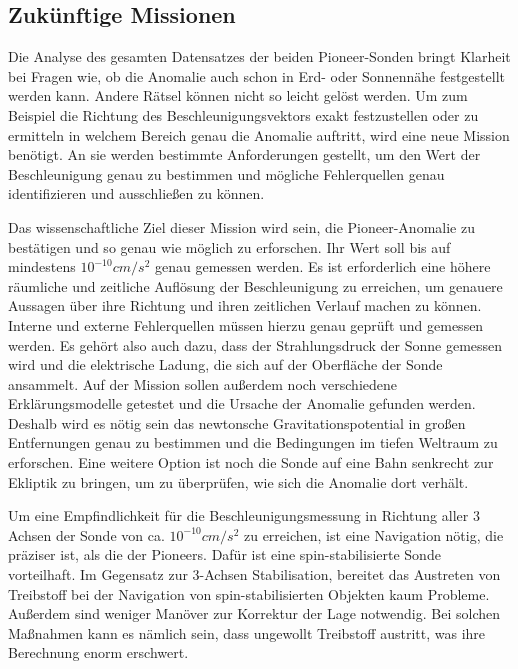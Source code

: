 
\subsection{Zuk\"unftige Missionen}

Die Analyse des gesamten Datensatzes der beiden Pioneer-Sonden bringt
Klarheit bei Fra\-gen wie, ob die Anomalie auch schon in Erd- oder
Sonnenn\"ahe festgestellt werden kann. Andere R\"atsel k\"onnen nicht
so leicht gel\"ost werden. Um zum Beispiel die Richtung des
Be\-schleunigungsvektors exakt festzustellen oder zu ermitteln in
welchem Bereich genau die Anomalie auftritt, wird eine neue Mission
ben\"otigt. An sie werden bestimmte Anforderun\-gen gestellt\cite{alle2005}\cite{Nieto2004b}\cite{Turyshev2004b}\cite{Nieto2004},
 um den Wert der Beschleunigung genau zu bestimmen
und m\"ogliche Fehlerquellen genau identifizieren und ausschlie{\ss}en
zu k\"onnen.


\bigskip

Das wissenschaftliche Ziel dieser Mission wird sein, die
Pioneer-Anomalie zu best\"atigen und so genau wie m\"oglich zu
erforschen. Ihr Wert soll bis auf mindestens 
$10^{-10}\mathit{cm}/s^{2}$ ge\-nau gemessen werden. Es ist
erforderlich eine h\"ohere r\"aumliche und zeitliche Aufl\"osung der
Beschleunigung zu erreichen, um genauere Aussagen \"uber ihre Richtung
und ihren zeitlichen Verlauf machen zu k\"onnen. Interne und externe
Fehlerquellen m\"ussen hierzu genau gepr\"uft und gemessen werden. Es
geh\"ort also auch dazu, dass der Strahlungsdruck der Sonne gemessen
wird und die elektrische Ladung, die sich auf der Oberfl\"ache der
Son\-de ansammelt. Auf der Mission sollen au{\ss}erdem noch
verschiedene Erkl\"arungsmodelle ge\-testet und die Ursache der
Anomalie gefunden werden. Deshalb wird es n\"otig sein das newtonsche
Gravitationspotential in gro{\ss}en Entfernungen genau zu bestimmen und
die Bedingungen im tiefen Weltraum zu erforschen. Eine weitere Option
ist noch die Sonde auf eine Bahn senkrecht zur Ekliptik zu bringen, um
zu \"uberpr\"ufen, wie sich die Anomalie dort verh\"alt.


\bigskip

Um eine Empfindlichkeit f\"ur die Beschleunigungsmessung in Richtung
aller 3 Achsen der Sonde von ca.  $10^{-10}\mathit{cm}/s^{2}$ zu
erreichen, ist eine Navigation n\"otig, die pr\"aziser ist, als die der
Pioneers. Daf\"ur ist eine spin-stabilisierte Sonde vorteilhaft. Im
Gegensatz zur 3-Achsen Stabilisation, bereitet das Austreten von
Treibstoff bei der Navigation von spin-stabilisier\-ten Objekten kaum
Probleme. Au{\ss}erdem sind weniger Man\"over zur Korrektur der Lage
notwendig. Bei solchen Ma{\ss}nahmen kann es n\"amlich sein, dass
ungewollt Treibstoff aus\-tritt, was ihre Berechnung enorm erschwert.



